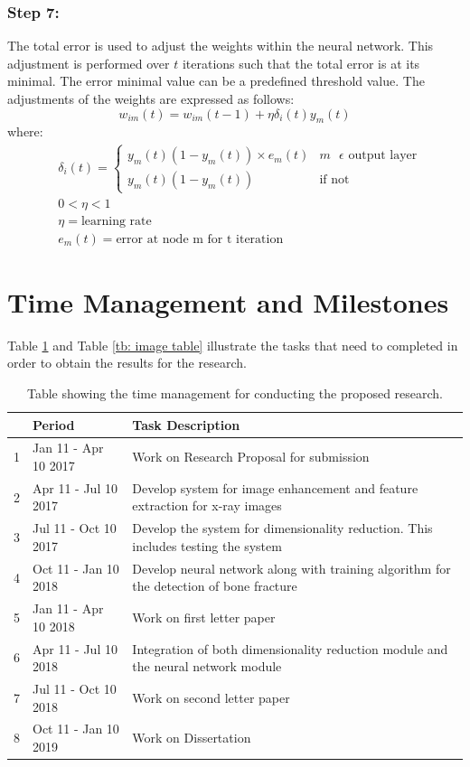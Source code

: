 \documentclass[11pt]{article}
\begin{document}
	\subsubsection{Step 7:}
	The total error is used to adjust the weights within the neural network. This adjustment is performed over $t$ iterations such that the total error is at its minimal. The error minimal value can be a predefined threshold value. The adjustments of the weights are expressed as follows:
	\begin{equation}
		w_{im}(t) = w_{im}(t-1)+\eta\delta_i(t)y_m(t)
	\end{equation}
	where:
	\begin{align*}
		& \delta_i(t) = 
		\begin{cases}
			y_m(t)(1 - y_m(t))\times e_m(t) & m \text{ } \epsilon \text{ output layer}\\
			y_m(t)(1 - y_m(t)) & \text{if not}
		\end{cases} \\
		& 0 < \eta < 1 \\
		& \eta = \text{learning rate} \\
		& e_m(t) = \text{error at node m for t iteration}
	\end{align*}

	\section{Time Management and Milestones}
	\label{sc: Time Management and Milestones}
	Table \ref{time_management} and Table \ref{tb: image table} illustrate the tasks that need to completed in order to obtain the results for the research.
	\begin{table}[!h]
		\centering
		\caption{Table showing the time management for conducting the proposed research.}
		\label{time_management}
		\begin{tabular}{| c | l | p{9.5cm} |}
			\hline
			& Period & Task Description \\
			\hline \hline
			1 & Jan 11 - Apr 10 2017 & Work on Research Proposal for submission\\
			\hline
			2 & Apr 11 - Jul 10 2017 & Develop system for image enhancement and feature extraction for x-ray images \\
			\hline
			3 & Jul 11 - Oct 10 2017 &  Develop the system for dimensionality reduction. This includes testing the system\\
			\hline
			4 & Oct 11 - Jan 10 2018 & Develop neural network along with training algorithm for the detection of bone fracture \\
			\hline
			5 & Jan 11 - Apr 10 2018 & Work on first letter paper \\
			\hline
			6 & Apr 11 - Jul 10 2018 & Integration of both dimensionality reduction module and the neural network module \\
			\hline
			7 & Jul 11 - Oct 10 2018 & Work on second letter paper\\
			\hline
			8 & Oct 11 - Jan 10 2019 & Work on Dissertation \\
			\hline
		\end{tabular}
	\end{table}
	
\end{document}
